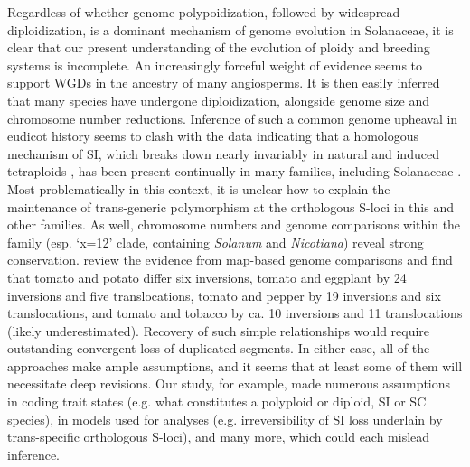 Regardless of whether genome polypoidization, followed by widespread diploidization, is a dominant mechanism of genome evolution in Solanaceae, it is clear that our present understanding of the evolution of ploidy and breeding systems is incomplete.
An increasingly forceful weight of evidence seems to support WGDs in the ancestry of many angiosperms. %
It is then easily inferred that many species have undergone diploidization, alongside genome size and chromosome number reductions. %
Inference of such a common genome upheaval in eudicot history seems to clash with the data indicating that a homologous mechanism of SI, which breaks down nearly invariably in natural and induced tetraploids \citep{stone_2002,mcclure_2009}, has been present continually in many families, including Solanaceae \citep{igic_2006}. 
Most problematically in this context, it is unclear how to explain the maintenance of trans-generic polymorphism at the orthologous S-loci in this and other families.
As well, chromosome numbers and genome comparisons within the family (esp. `x=12' clade, containing \textit{Solanum} and \textit{Nicotiana}) reveal strong conservation.
\citet{wu_2010a} review the evidence from map-based genome comparisons and find that tomato and potato differ six inversions, tomato and eggplant by 24 inversions and five translocations, tomato and pepper by 19 inversions and six translocations, and tomato and tobacco by ca. 10 inversions and 11 translocations (likely underestimated).
Recovery of such simple relationships would require outstanding convergent loss of duplicated segments.
In either case, all of the approaches make ample assumptions, and it seems that at least some of them will necessitate deep revisions.
Our study, for example, made numerous assumptions in coding trait states (e.g. what constitutes a polyploid or diploid, SI or SC species), in models used for analyses (e.g. irreversibility of SI loss underlain by trans-specific orthologous S-loci), and many more, which could each mislead inference. %

\bigskip

